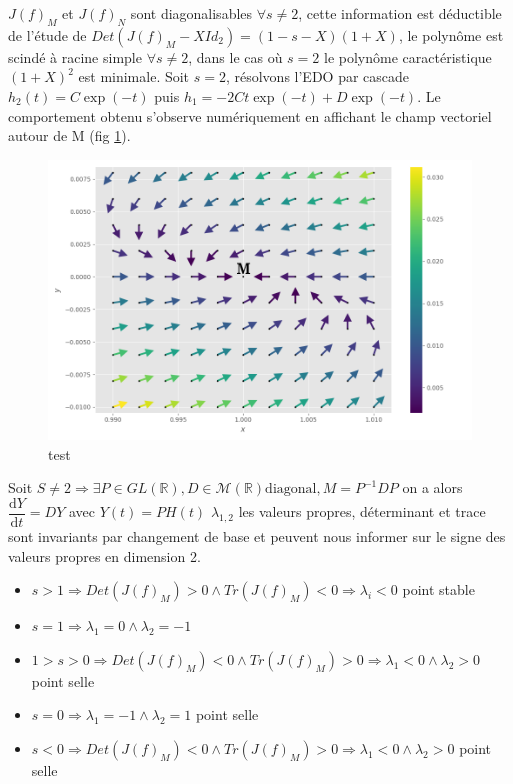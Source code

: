 \documentclass{wsdcr}
\begin{document}
$J(f)_{M}$ et $ J(f)_{N}$ sont diagonalisables $\forall s \neq 2$, cette information est déductible de l'étude de $Det(J(f)_{M}-XId_2)=(1-s-X)(1+X)$, le polynôme est scindé à racine simple $\forall s \neq 2$, dans le cas où $s=2$ le polynôme caractéristique $(1+X)^2$ est minimale. Soit $s=2$, résolvons l'EDO par cascade $h_2(t)=C\exp(-t)$ puis $h_1=-2Ct\exp(-t)+D\exp(-t)$. Le comportement obtenu s'observe numériquement en affichant le champ vectoriel autour de M (fig \ref{fig:JM}). \\
\begin{figure}[t!]
    \centering
    \includegraphics[width=\linewidth]{fig/lv2_vfM.png}
    \caption{test}
    \label{fig:JM}
\end{figure}
Soit $S\neq2 \Rightarrow \exists P \in GL(\mathbb{R}),D \in \mathcal{M}(\mathbb{R}) \text{diagonal}, M = P^{-1}DP$ on a alors ${\dfrac {\mathrm {d} Y}{\mathrm {d} t}}=DY$ avec $Y(t)=PH(t)$ $\lambda_{1,2}$ les valeurs propres, déterminant et trace sont invariants par changement de base et peuvent nous informer sur le signe des valeurs propres en dimension 2.
\begin{itemize}
	\item $s>1 \Rightarrow Det(J(f)_{M})>0 \land Tr(J(f)_{M})<0 \Rightarrow \lambda_i<0$ {\color{red}point stable}
	\item $s=1 \Rightarrow \lambda_1=0 \land \lambda_2=-1$ 
	\item $1>s>0 \Rightarrow Det(J(f)_{M})<0 \land Tr(J(f)_{M})>0 \Rightarrow \lambda_1<0 \land \lambda_2>0$ {\color{red}point selle}
	\item $s=0 \Rightarrow \lambda_1=-1 \land \lambda_2=1$ {\color{red}point selle}
	\item $s<0 \Rightarrow Det(J(f)_{M})<0 \land Tr(J(f)_{M})>0 \Rightarrow \lambda_1<0 \land \lambda_2>0$ {\color{red}point selle}
\end{itemize}
\end{document}
